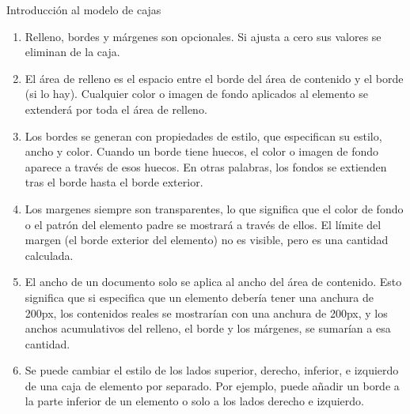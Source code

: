 \begin{frame}{Introducción al modelo de cajas}
    \begin{enumerate}
        \item Relleno, bordes y márgenes son opcionales. Si ajusta a cero sus
        valores se eliminan de la caja. 
        \item El área de relleno es el espacio entre el borde del área de
        contenido y el borde (si lo hay). Cualquier color o imagen de fondo
        aplicados al elemento se extenderá por toda el área de relleno. 
        \item Los bordes se generan con propiedades de estilo, que especifican
        su estilo, ancho y color. Cuando un borde tiene huecos, el color o
        imagen de fondo aparece a través de esos huecos. En otras palabras, los
        fondos se extienden tras el borde hasta el borde exterior. 
        \item Los margenes siempre son transparentes, lo que significa que el
        color de fondo o el patrón del elemento padre se mostrará a través de
        ellos. El límite del margen (el borde exterior del elemento) no es
        visible,  pero es una cantidad calculada. 
        \item El ancho de un documento solo se aplica al ancho del área de
        contenido. Esto significa que si especifica que un elemento debería
        tener una anchura de 200px, los contenidos reales se mostrarían con una
        anchura de 200px, y los anchos acumulativos del relleno, el borde y los
        márgenes, se sumarían a esa cantidad.
        \item Se puede cambiar el estilo de los lados superior, derecho,
        inferior, e izquierdo de una caja de elemento por separado. Por
        ejemplo, puede añadir un borde a la parte inferior de un elemento o
        solo a los lados derecho e izquierdo. 
    \end{enumerate}

    
\end{frame}





